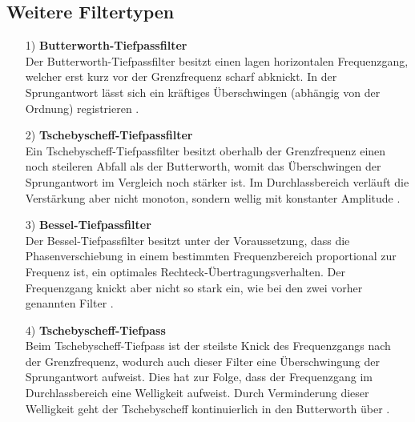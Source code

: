 \subsection*{Weitere Filtertypen}
\begin{itemize}
    \item[1)]\textbf{Butterworth-Tiefpassfilter}\\
    Der Butterworth-Tiefpassfilter besitzt einen lagen horizontalen Frequenzgang, welcher erst kurz vor der Grenzfrequenz scharf abknickt. In der Sprungantwort lässt sich ein kräftiges Überschwingen (abhängig von der Ordnung) registrieren \citep{VA}.
    \item[2)]\textbf{Tschebyscheff-Tiefpassfilter}\\
    Ein Tschebyscheff-Tiefpassfilter besitzt oberhalb der Grenzfrequenz einen noch steileren Abfall als der Butterworth, womit das Überschwingen der Sprungantwort im Vergleich noch stärker ist. Im Durchlassbereich verläuft die Verstärkung aber nicht monoton, sondern wellig mit konstanter Amplitude \citep{VA}.
    \item[3)]\textbf{Bessel-Tiefpassfilter}\\
    Der Bessel-Tiefpassfilter besitzt unter der Voraussetzung, dass die Phasenverschiebung in einem bestimmten Frequenzbereich proportional zur Frequenz ist, ein optimales Rechteck-Übertragungsverhalten. Der Frequenzgang knickt aber nicht so stark ein, wie bei den zwei vorher genannten Filter \citep{VA}.
    \item[4)]\textbf{Tschebyscheff-Tiefpass}\\
    Beim Tschebyscheff-Tiefpass ist der steilste Knick des Frequenzgangs nach der Grenzfrequenz, wodurch auch dieser Filter eine Überschwingung der Sprungantwort aufweist. Dies hat zur Folge, dass der Frequenzgang im Durchlassbereich eine Welligkeit aufweist. Durch Verminderung dieser Welligkeit geht der Tschebyscheff kontinuierlich in den Butterworth über \citep{VA}. 
\end{itemize}

